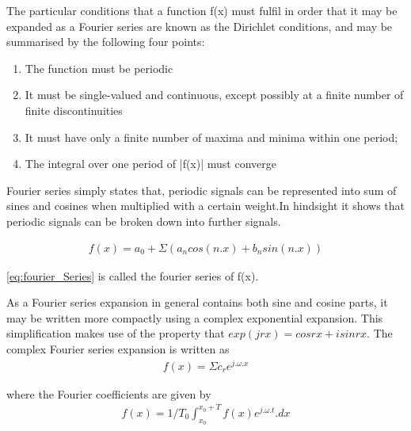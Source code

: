 \documentclass{article}
\begin{document}
The particular conditions that a function f(x) must fulfil in order that it may be expanded as a Fourier series are known as the Dirichlet conditions, and may be summarised by
the following four points:

\begin{enumerate}
    \item
    The function must be periodic
    
    \item
    It must be single-valued and continuous, except possibly at a finite number of finite discontinuities
    
    \item 
    It must have only a finite number of maxima and minima within one period;
    
    \item
    The integral over one period of |f(x)| must converge
\end{enumerate}

Fourier series simply states that, periodic signals can be represented into sum of sines and cosines when multiplied with a certain weight.In hindsight it shows that periodic signals can be broken down into further signals. 

\begin{equation}
\begin{aligned}
     f(x) = a_0 + \Sigma(a_n cos(n.x) + b_n sin(n.x))
\end{aligned}
\label{eq:fourier_Series}
\end{equation}

\eqref{eq:fourier_Series} is called the fourier series of f(x). 

As a Fourier series expansion in general contains both sine and cosine parts, it may be written more compactly using a complex exponential expansion. This simplification makes use of the property that $exp(jrx) = cosrx + i sin rx$. The complex Fourier series expansion is written as
\begin{equation}
\begin{aligned}
     f(x) = \Sigma c_r e^{j.\omega.x}
\end{aligned}
\label{eq:complex_fourier_Series}
\end{equation}

where the Fourier coefficients are given by 
\begin{equation}
\begin{aligned}
     f(x) = 1/T_0 \int_{x_0}^{x_0 + T} f(x) e^{j.\omega.t} . dx
\end{aligned}
\label{eq:coeff_complex_fourier_Series}
\end{equation}
\end{document}
